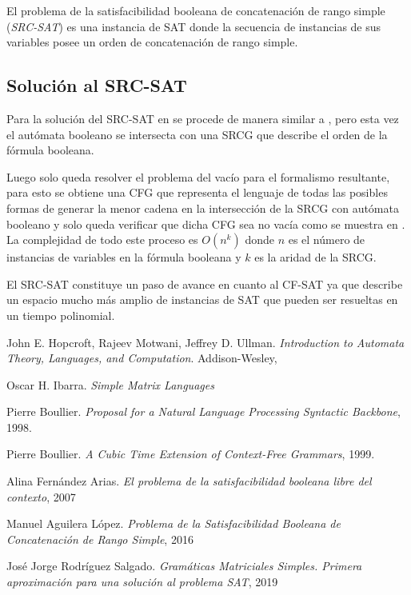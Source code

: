 \documentclass{article}
\begin{document}
El problema de la satisfacibilidad booleana de concatenación de rango simple (\textit{SRC-SAT}) es una instancia de
SAT donde la secuencia de instancias de sus variables posee un orden de concatenación de rango simple.

\subsection{Solución al SRC-SAT}

Para la solución del SRC-SAT en \cite{aSRCSAT} se procede de manera similar a \cite{aCFSAT}, pero esta vez el autómata
booleano se intersecta con una SRCG que describe el orden de la fórmula booleana.

Luego solo queda resolver el problema del vacío para el formalismo resultante, para esto se obtiene una CFG
que representa el lenguaje de todas las posibles formas de generar la menor cadena en la intersección de la SRCG
con autómata booleano y solo queda verificar que dicha CFG sea no vacía como se muestra en \cite{aCFSAT}. La complejidad
de todo este proceso es $O(n^k)$ donde $n$ es el número de instancias de variables en la fórmula booleana y $k$ es
la aridad de la SRCG.

El SRC-SAT constituye un paso de avance en cuanto al CF-SAT ya que describe un espacio mucho más amplio de instancias de SAT
que pueden ser resueltas en un tiempo polinomial.

\begin{thebibliography}{9}

      John E. Hopcroft, Rajeev Motwani, Jeffrey D. Ullman.
      \textit{Introduction to Automata Theory, Languages, and Computation}.
      Addison-Wesley,

      Oscar H. Ibarra.
      \textit{Simple Matrix Languages}

      Pierre Boullier.
      \textit{Proposal for a Natural Language Processing Syntactic Backbone},
      1998.

      Pierre Boullier.
      \textit{A Cubic Time Extension of Context-Free Grammars},
      1999.

      Alina Fernández Arias.
      \textit{El problema de la satisfacibilidad booleana libre del contexto},
      2007

      Manuel Aguilera López.
      \textit{Problema de la Satisfacibilidad Booleana de Concatenación de Rango Simple},
      2016

      José Jorge Rodríguez Salgado.
      \textit{Gramáticas Matriciales Simples. Primera aproximación para una solución al problema SAT},
      2019

\end{thebibliography}
\end{document}
